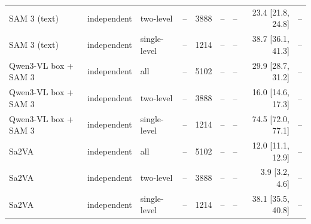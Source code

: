 \begin{tabular}{llllrrrrr}
SAM 3 (text) & independent & two-level & -- & 3888 & -- & -- & 23.4 \scriptsize{[21.8, 24.8]} & -- \\
SAM 3 (text) & independent & single-level & -- & 1214 & -- & -- & 38.7 \scriptsize{[36.1, 41.3]} & -- \\
\midrule
Qwen3-VL box + SAM 3 & independent & all & -- & 5102 & -- & -- & 29.9 \scriptsize{[28.7, 31.2]} & -- \\
Qwen3-VL box + SAM 3 & independent & two-level & -- & 3888 & -- & -- & 16.0 \scriptsize{[14.6, 17.3]} & -- \\
Qwen3-VL box + SAM 3 & independent & single-level & -- & 1214 & -- & -- & 74.5 \scriptsize{[72.0, 77.1]} & -- \\
\midrule
Sa2VA & independent & all & -- & 5102 & -- & -- & 12.0 \scriptsize{[11.1, 12.9]} & -- \\
Sa2VA & independent & two-level & -- & 3888 & -- & -- & 3.9 \scriptsize{[3.2, 4.6]} & -- \\
Sa2VA & independent & single-level & -- & 1214 & -- & -- & 38.1 \scriptsize{[35.5, 40.8]} & -- \\
\bottomrule
\end{tabular}
